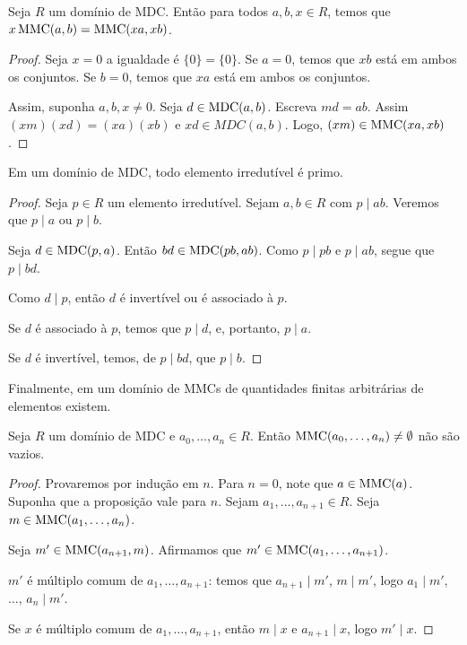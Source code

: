 \begin{corol}
    Seja $R$ um domínio de MDC.
    Então para todos $a, b, x \in R$, temos que $x\operatorname{MMC}(a, b)=\operatorname{MMC}(xa, xb)$.
\end{corol}
\begin{proof}
Seja $x=0$ a igualdade é $\{0\}=\{0\}$.
Se $a=0$, temos que $xb$ está em ambos os conjuntos.
Se $b=0$, temos que $xa$ está em ambos os conjuntos.

Assim, suponha $a, b, x \neq 0$.
Seja $d\in \operatorname{MDC}(a, b)$.
Escreva $md=ab$.
Assim $(xm)(xd)=(xa)(xb)$ e $xd \in MDC(a, b)$.
Logo, $(xm)\in \operatorname{MMC}(xa, xb)$.
\end{proof}

\begin{lemma}
    Em um domínio de MDC, todo elemento irredutível é primo.
    \end{lemma}
    
\begin{proof}
    Seja $p \in R$ um elemento irredutível.
    Sejam $a, b \in R$ com $p\mid ab$.
    Veremos que $p\mid a$ ou $p\mid b$.

    Seja $d\in\operatorname{MDC}(p, a)$.
    Então $bd\in \operatorname{MDC}(pb, ab)$.
    Como $p\mid pb$ e $p\mid ab$, segue que $p\mid bd$.

    Como $d\mid p$, então $d$ é invertível ou é associado à $p$.

    Se $d$ é associado à $p$, temos que $p\mid d$, e, portanto, $p\mid a$.

    Se $d$ é invertível, temos, de $p\mid bd$, que $p\mid b$.
\end{proof}

Finalmente, em um domínio de MMCs de quantidades finitas arbitrárias de elementos existem.

\begin{prop}
    Seja $R$ um domínio de MDC e $a_0, \dots, a_n \in R$.
    Então $\operatorname{MMC}(a_0, \dots, a_n)\neq \emptyset$ não são vazios.
\end{prop}

\begin{proof}
Provaremos por indução em $n$.
Para $n=0$, note que $a \in \operatorname{MMC}(a)$.
Suponha que a proposição vale para $n$. Sejam $a_1, \dots, a_{n+1} \in R$.
Seja $m\in \operatorname{MMC}(a_1, \dots, a_n)$.

Seja $m' \in \operatorname{MMC}(a_{n+1}, m)$.
Afirmamos que $m'\in \operatorname{MMC}(a_1, \dots, a_{n+1})$.

$m'$ é múltiplo comum de $a_1, \dots, a_{n+1}$: temos que $a_{n+1}\mid m'$, $m\mid m'$, logo $a_1\mid m'$, $\dots$, $a_n\mid m'$.

Se $x$ é múltiplo comum de $a_1, \dots, a_{n+1}$, então $m\mid x$ e $a_{n+1}\mid x$, logo $m'\mid x$.
\end{proof}
